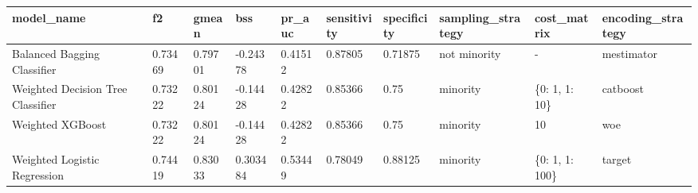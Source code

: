 \begin{tabular}{|l|l|l|l|l|l|l|l|l|l|}
\hline
\textbf{model\_name}              & \textbf{f2} & \textbf{gmean} & \textbf{bss} & \textbf{pr\_auc} & \textbf{sensitivity} & \textbf{specificity} & \textbf{sampling\_strategy} & \textbf{cost\_matrix} & \textbf{encoding\_strategy} \\ \hline
Balanced Bagging Classifier       & 0.73469     & 0.79701        & -0.24378     & 0.41512          & 0.87805              & 0.71875              & not minority                & -                     & mestimator                  \\ \hline
Weighted Decision Tree Classifier & 0.73222     & 0.80124        & -0.14428     & 0.42822          & 0.85366              & 0.75                 & minority                    & \{0: 1, 1: 10\}       & catboost                    \\ \hline
Weighted XGBoost                  & 0.73222     & 0.80124        & -0.14428     & 0.42822          & 0.85366              & 0.75                 & minority                    & 10                    & woe                         \\ \hline
Weighted Logistic Regression      & 0.74419     & 0.83033        & 0.303484     & 0.53449          & 0.78049              & 0.88125              & minority                    & \{0: 1, 1: 100\}      & target                      \\ \hline
\end{tabular}